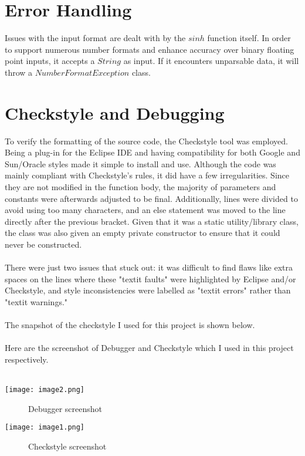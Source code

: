 \documentclass[letterpaper, 11pt]{report}
\begin{document}
\section*{{Error Handling}}
\normalsize{Issues with the input format are dealt with by the $sinh$ function itself. In order to support numerous number formats and enhance accuracy over binary floating point inputs, it accepts a $String$ as input. If it encounters unparsable data, it will throw a $NumberFormatException$ class.}

\section*{{Checkstyle and Debugging}}
To verify the formatting of the source code, the Checkstyle tool was employed. Being a plug-in for the Eclipse IDE and having compatibility for both Google and Sun/Oracle styles made it simple to install and use. Although the code was mainly compliant with Checkstyle's rules, it did have a few irregularities. Since they are not modified in the function body, the majority of parameters and constants were afterwards adjusted to be final. Additionally, lines were divided to avoid using too many characters, and an else statement was moved to the line directly after the previous bracket. Given that it was a static utility/library class, the class was also given an empty private constructor to ensure that it could never be constructed.\\\\


There were just two issues that stuck out: it was difficult to find flaws like extra spaces on the lines where these "textit faults" were highlighted by Eclipse and/or Checkstyle, and style inconsistencies were labelled as "textit errors" rather than "textit warnings." \\\\ 
The snapshot of the checkstyle I used for this project is shown below.\\\\

Here are the screenshot of Debugger and Checkstyle which I used in this project respectively.\\\\
\begin{center}
    \texttt{[image: image2.png]} \\
    \begin{figure}[h!]
    \centering
        \caption{Debugger screenshot}
        \label{Debugger screenshot}
    \end{figure}
\end{center}

\begin{center}
    \texttt{[image: image1.png]} \\
    \begin{figure}[h!]
    \centering
        \caption{Checkstyle screenshot}
        \label{Checkstyle screenshot}
    \end{figure}
\end{center}
\pagebreak
\end{document}
